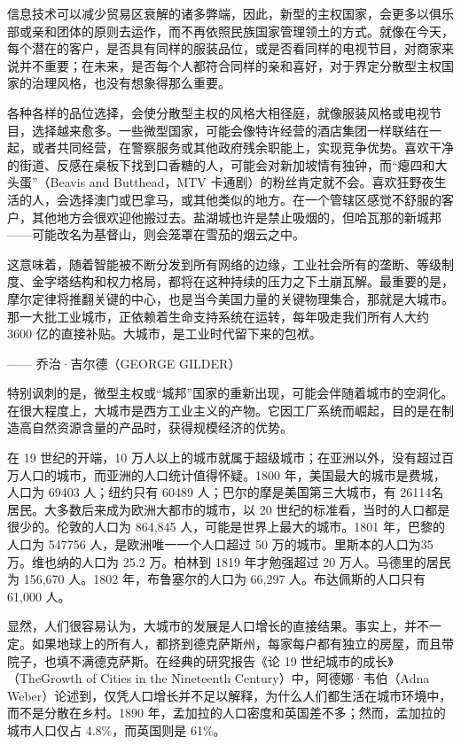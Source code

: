 信息技术可以减少贸易区衰解的诸多弊端，因此，新型的主权国家，会更多以俱乐部或亲和团体的原则去运作，而不再依照民族国家管理领土的方式。就像在今天，每个潜在的客户，是否具有同样的服装品位，或是否看同样的电视节目，对商家来说并不重要；在未来，是否每个人都符合同样的亲和喜好，对于界定分散型主权国家的治理风格，也没有想象得那么重要。

各种各样的品位选择，会使分散型主权的风格大相径庭，就像服装风格或电视节目，选择越来愈多。一些微型国家，可能会像特许经营的酒店集团一样联结在一起，或者共同经营，在警察服务或其他政府残余职能上，实现竞争优势。喜欢干净的街道、反感在桌板下找到口香糖的人，可能会对新加坡情有独钟，而“瘪四和大头蛋”（Beavis and Butthead，MTV 卡通剧）的粉丝肯定就不会。喜欢狂野夜生活的人，会选择澳门或巴拿马，或其他类似的地方。在一个管辖区感觉不舒服的客户，其他地方会很欢迎他搬过去。盐湖城也许是禁止吸烟的，但哈瓦那的新城邦——可能改名为基督山，则会笼罩在雪茄的烟云之中。

\begin{tcolorbox}
这意味着，随着智能被不断分发到所有网络的边缘，工业社会所有的垄断、等级制度、金字塔结构和权力格局，都将在这种持续的压力之下土崩瓦解。最重要的是，摩尔定律将推翻关键的中心，也是当今美国力量的关键物理集合，那就是大城市。那一大批工业城市，正依赖着生命支持系统在运转，每年吸走我们所有人大约 3600 亿的直接补贴。大城市，是工业时代留下来的包袱。
\begin{flushright}
—— 乔治·吉尔德（GEORGE GILDER）  
\end{flushright}
\end{tcolorbox}

特别讽刺的是，微型主权或“城邦”国家的重新出现，可能会伴随着城市的空洞化。在很大程度上，大城市是西方工业主义的产物。它因工厂系统而崛起，目的是在制造高自然资源含量的产品时，获得规模经济的优势。

在 19 世纪的开端，10 万人以上的城市就属于超级城市；在亚洲以外，没有超过百万人口的城市，而亚洲的人口统计值得怀疑。1800 年，美国最大的城市是费城，人口为 69403 人；纽约只有 60489 人；巴尔的摩是美国第三大城市，有 26114名居民。大多数后来成为欧洲大都市的城市，以 20 世纪的标准看，当时的人口都是很少的。伦敦的人口为 864,845 人，可能是世界上最大的城市。1801 年，巴黎的人口为 547756 人，是欧洲唯一一个人口超过 50 万的城市。里斯本的人口为35 万。维也纳的人口为 25.2 万。柏林到 1819 年才勉强超过 20 万人。马德里的居民为 156,670 人。1802 年，布鲁塞尔的人口为 66,297 人。布达佩斯的人口只有 61,000 人。

显然，人们很容易认为，大城市的发展是人口增长的直接结果。事实上，并不一定。如果地球上的所有人，都挤到德克萨斯州，每家每户都有独立的房屋，而且带院子，也填不满德克萨斯。在经典的研究报告《论 19 世纪城市的成长》（TheGrowth of Cities in the Nineteenth Century）中，阿德娜·韦伯（Adna Weber）论述到，仅凭人口增长并不足以解释，为什么人们都生活在城市环境中，而不是分散在乡村。1890 年，孟加拉的人口密度和英国差不多；然而，孟加拉的城市人口仅占 4.8\%，而英国则是 61\%。

